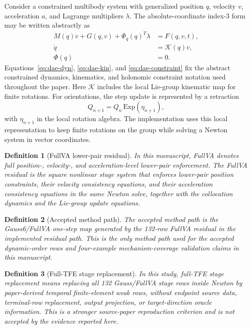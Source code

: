 \documentclass[preprint,12pt]{elsarticle}
\newtheorem{definition}{Definition}
\newcommand{\method}{Gauss6\slash FullVA}
\newcommand{\tfe}{TFE}
\begin{document}
Consider a constrained multibody system with generalized position $q$,
velocity $v$, acceleration $a$, and Lagrange multipliers $\lambda$. The
absolute-coordinate index-3 form may be written abstractly as
\begin{align}
  M(q)\dot v + G(q,v) + \Phi_q(q)^T\lambda &= F(q,v,t), \label{eq:dae-dyn}\\
  \dot q &= \mathcal{K}(q)v, \label{eq:dae-kin}\\
  \Phi(q) &= 0. \label{eq:dae-constraint}
\end{align}
Equations~\eqref{eq:dae-dyn}, \eqref{eq:dae-kin}, and
\eqref{eq:dae-constraint} fix the
abstract constrained dynamics, kinematics, and holonomic constraint notation
used throughout the paper.
Here $\mathcal{K}$ includes the local Lie-group kinematic map for finite
rotations. For orientations, the step update is represented by a retraction
\begin{equation}
  Q_{n+1}=Q_n\,\mathrm{Exp}(\eta_{n+1}),
  \label{eq:retraction}
\end{equation}
with $\eta_{n+1}$ in the local rotation algebra. The implementation uses this
local representation to keep finite rotations on the group while solving a
Newton system in vector coordinates.

\begin{definition}[FullVA lower-pair residual]
In this manuscript, FullVA denotes full position-, velocity-, and
acceleration-level lower-pair enforcement. The FullVA residual is the square
nonlinear stage system that enforces lower-pair position constraints, their
velocity consistency equations, and their acceleration consistency equations in
the same Newton solve, together with the collocation dynamics and the
Lie-group update equations.
\end{definition}

\begin{definition}[Accepted method path]
The accepted method path is the \method{} one-step map generated by the
132-row FullVA residual in the implemented residual path. This is the only method path
used for the accepted dynamic-order rows and four-example
mechanism-coverage validation claims in this manuscript.
\end{definition}

\begin{definition}[Full-\tfe{} stage replacement]
In this study, full-\tfe{} stage replacement means replacing all 132
Gauss/FullVA stage rows inside Newton by paper-derived temporal
finite-element weak rows, without endpoint source data, terminal-row
replacement, output projection, or target-direction oracle information. This
is a stronger source-paper reproduction criterion and is not accepted by the
evidence reported here.
\end{definition}
\end{document}
